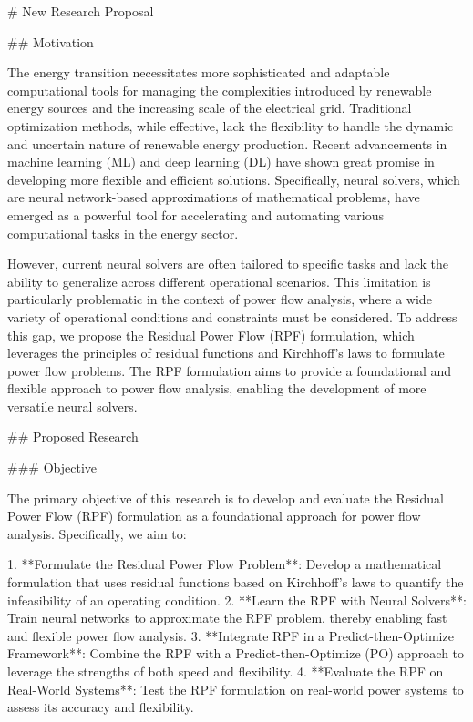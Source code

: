 # New Research Proposal

## Motivation

The energy transition necessitates more sophisticated and adaptable computational tools for managing the complexities introduced by renewable energy sources and the increasing scale of the electrical grid. Traditional optimization methods, while effective, lack the flexibility to handle the dynamic and uncertain nature of renewable energy production. Recent advancements in machine learning (ML) and deep learning (DL) have shown great promise in developing more flexible and efficient solutions. Specifically, neural solvers, which are neural network-based approximations of mathematical problems, have emerged as a powerful tool for accelerating and automating various computational tasks in the energy sector.

However, current neural solvers are often tailored to specific tasks and lack the ability to generalize across different operational scenarios. This limitation is particularly problematic in the context of power flow analysis, where a wide variety of operational conditions and constraints must be considered. To address this gap, we propose the Residual Power Flow (RPF) formulation, which leverages the principles of residual functions and Kirchhoff's laws to formulate power flow problems. The RPF formulation aims to provide a foundational and flexible approach to power flow analysis, enabling the development of more versatile neural solvers.

## Proposed Research

### Objective

The primary objective of this research is to develop and evaluate the Residual Power Flow (RPF) formulation as a foundational approach for power flow analysis. Specifically, we aim to:

1. **Formulate the Residual Power Flow Problem**: Develop a mathematical formulation that uses residual functions based on Kirchhoff's laws to quantify the infeasibility of an operating condition.
2. **Learn the RPF with Neural Solvers**: Train neural networks to approximate the RPF problem, thereby enabling fast and flexible power flow analysis.
3. **Integrate RPF in a Predict-then-Optimize Framework**: Combine the RPF with a Predict-then-Optimize (PO) approach to leverage the strengths of both speed and flexibility.
4. **Evaluate the RPF on Real-World Systems**: Test the RPF formulation on real-world power systems to assess its accuracy and flexibility.

